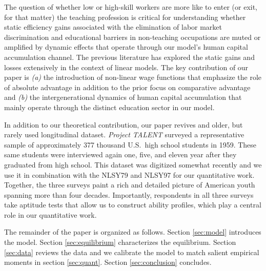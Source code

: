 \documentclass[onehalfspacing,11pt]{article}
\begin{document}
	The question of whether low or high-skill workers are more like to enter (or exit, for that matter) the teaching profession is critical for understanding whether static efficiency gains associated with the elimination of labor market discrimination and educational barriers in non-teaching occupations are muted or amplified by dynamic effects that operate through our model's human capital accumulation channel. The previous literature has explored the static gains and losses extensively in the context of linear models. The key contribution of our paper is {\it (a)} the introduction of non-linear wage functions that emphasize the role of absolute advantage in addition to the prior focus on comparative advantage and {\it (b)} the intergenerational dynamics of human capital accumulation that mainly operate through the distinct education sector in our model.
	
	In addition to our theoretical contribution, our paper revives and older, but rarely used longitudinal dataset. {\it Project TALENT} surveyed a representative sample of approximately 377 thousand U.S.~high school students in 1959. These same students were interviewed again one, five, and eleven year after they graduated from high school. This dataset was digitized somewhat recently and we use it in combination with the NLSY79 and NLSY97 for our quantitative work. Together, the three surveys paint a rich and detailed picture of American youth spanning more than four decades. Importantly, respondents in all three surveys take aptitude tests that allow us to construct ability profiles, which play a central role in our quantitative work.
	
	
	The remainder of the paper is organized as follows. Section \ref{sec:model} introduces the model. Section \ref{sec:equilibrium} characterizes the equilibrium. Section \ref{sec:data} reviews the data and we calibrate the model to match salient empirical moments in section \ref{sec:quant}. Section \ref{sec:conclusion} concludes.
	
\end{document}
